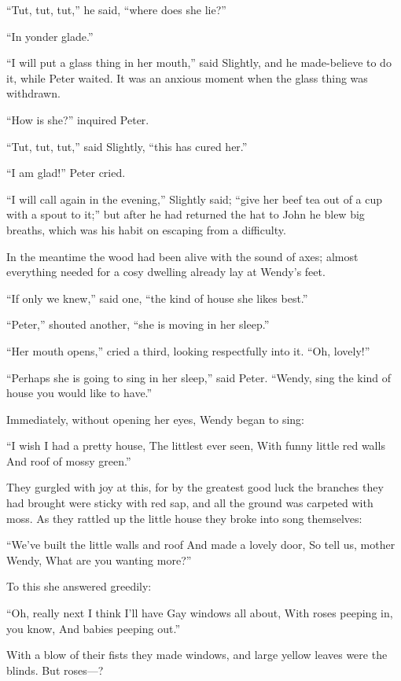 ``Tut, tut, tut,'' he said, ``where does she lie?''

``In yonder glade.''

``I will put a glass thing in her mouth,'' said Slightly, and he
made-believe to do it, while Peter waited. It was an anxious moment
when the glass thing was withdrawn.

``How is she?'' inquired Peter.

``Tut, tut, tut,'' said Slightly, ``this has cured her.''

``I am glad!'' Peter cried.

``I will call again in the evening,'' Slightly said; ``give her beef tea
out of a cup with a spout to it;'' but after he had returned the hat to
John he blew big breaths, which was his habit on escaping from a
difficulty.

In the meantime the wood had been alive with the sound of axes; almost
everything needed for a cosy dwelling already lay at Wendy's feet.

``If only we knew,'' said one, ``the kind of house she likes best.''

``Peter,'' shouted another, ``she is moving in her sleep.''

``Her mouth opens,'' cried a third, looking respectfully into it. ``Oh,
lovely!''

``Perhaps she is going to sing in her sleep,'' said Peter. ``Wendy, sing
the kind of house you would like to have.''

Immediately, without opening her eyes, Wendy began to sing:

``I wish I had a pretty house,
    The littlest ever seen,
With funny little red walls
    And roof of mossy green.''

They gurgled with joy at this, for by the greatest good luck the
branches they had brought were sticky with red sap, and all the ground
was carpeted with moss. As they rattled up the little house they broke
into song themselves:

``We've built the little walls and roof
    And made a lovely door,
So tell us, mother Wendy,
    What are you wanting more?''

To this she answered greedily:

``Oh, really next I think I'll have
    Gay windows all about,
With roses peeping in, you know,
    And babies peeping out.''

With a blow of their fists they made windows, and large yellow leaves
were the blinds. But roses—?

